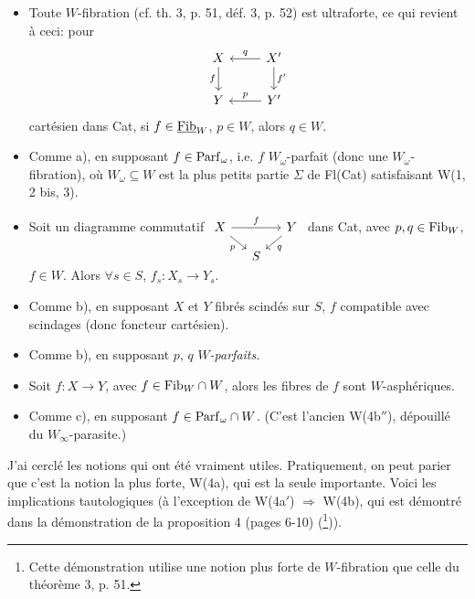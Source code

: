 \begin{itemize}[leftmargin=5em,labelsep=0.5em]
\item[\fbox{W(4a)}] Toute $W$-fibration (cf. th. 3, p. 51, déf. 3, p. 52) est ultraforte, ce qui revient à ceci: pour
\[
\begin{tikzcd}
X & X' \arrow[l,"q"'] \arrow[d,"f'"] \\
Y \arrow[from=u,"f"'] & Y' \arrow[l,"p"']
\end{tikzcd}
\]
cartésien dans Cat, si $f \in \underline{\mathrm{Fib}}_W$, $p \in W$, alors $q \in W$.

\item[W(4a$'$)] Comme a), en supposant $f \in \mathrm{Parf}_\omega$, i.e. $f$ $W_\omega$-parfait (donc une $W_\omega$-fibration), où $W_\omega \subseteq W$ est la plus petits partie $\Sigma$ de Fl(Cat) satisfaisant W(1, 2 bis, 3). %

\item[\fbox{W(4b)}] Soit un diagramme commutatif
$\begin{tikzcd}[ampersand replacement=\&, column sep=small, row sep=small, baseline=(X.base)]
|[alias=X]| X \arrow[rr,"f"] \arrow[dr,"p"'] \& \& Y \arrow[dl,"q"] \\
\& S \&
\end{tikzcd}$
dans Cat, avec $p, q \in \mathrm{Fib}_W$, $f \in W$.
Alors $\forall s \in S$, $f_s : X_s \longrightarrow Y_s$.

\item[W(4b$'$)] Comme b), en supposant $X$ et $Y$ fibrés scindés sur $S$, $f$ compatible avec scindages (donc foncteur cartésien).

\item[W(4b$''$)] Comme b), en supposant $p$, $q$ $W$\textit{-parfaits.}

\item[\fbox{W(4c)}] Soit $f : X \longrightarrow Y$, avec $f \in \mathrm{Fib}_W \cap W$, alors les fibres de $f$ sont $W$-asphériques.

\item[\dashedbox{W(4c$'$)}] Comme c), en supposant $f \in \mathrm{Parf}_\omega \cap W$. (C'est l'ancien W(4b$''$), dépouillé du $W_\infty$-parasite.)
\end{itemize}


J'ai cerclé les notions qui ont été vraiment utiles. Pratiquement, on peut parier que c'est la notion la plus forte, W(4a), qui est la seule importante. Voici les implications tautologiques (à l'exception de W(4a$'$) $\Longrightarrow$ W(4b), qui est démontré dans la démonstration de la proposition 4 (pages 6-10) (\footnote[61]{Cette démonstration utilise une notion plus forte de $W$-fibration que celle du théorème 3, p. 51.})).

